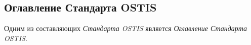 \subsection{Оглавление Стандарта OSTIS}
\label{standard_contents}

Одним из составляющих \textit{Стандарта OSTIS} является \textit{Оглавление Стандарта OSTIS}.

